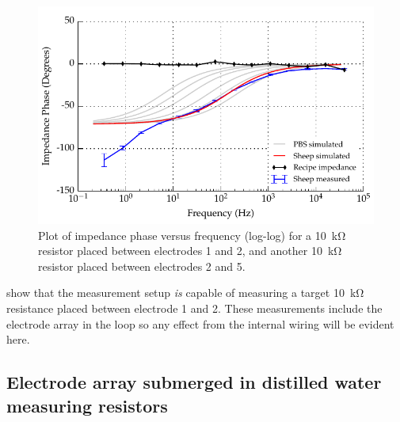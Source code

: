 \begin{figure}
    \centering
    \includegraphics[width=\textwidth]{content/appendices/Solution-Impedance-Measurements/graphics/run14_calibration_10k_noWater_ZVsF_graph_phase}
    \caption{\label{fig:calibration_10kRes_phase}Plot of impedance phase versus frequency (log-log) for a \SI{10}{\kilo\ohm} resistor placed between electrodes 1 and 2, and another \SI{10}{\kilo\ohm} resistor placed between electrodes 2 and 5.}
\end{figure}

 show that the measurement setup \emph{is} capable of measuring a target \SI{10}{\kilo\ohm} resistance placed between electrode 1 and 2.
These measurements include the electrode array in the loop so any effect from the internal wiring will be evident here.


\subsection{Electrode array submerged in distilled water measuring resistors}

